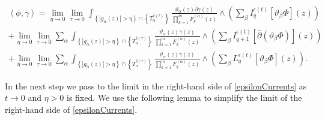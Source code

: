 \documentclass[11pt,reqno]{amsart}
\numberwithin{equation}{section}
\begin{document}
\begin{multline}\label{epsilonCurrents}
\left\langle\phi,\gamma\right\rangle
=\lim_{\eta\to 0}
\lim_{\tau\to 0}\int_{\left\{|g_{\alpha}(z)|>\eta\right\}\cap\left\{T^{\delta(\tau)}_{\alpha}\right\}}
\frac{\vartheta_{\alpha}(z)\bar\partial\gamma(z)}{\prod_{k=1}^m F^{(\alpha)}_k(z)}
\wedge\left(\sum_{\beta}I_q^{\epsilon(t)}\left[\vartheta_{\beta}\Phi\right](z)\right)\\
+\lim_{\eta\to 0}\lim_{\tau\to 0}\sum_{\alpha}
\int_{\left\{|g_{\alpha}(z)|>\eta\right\}\cap\left\{T^{\delta(\tau)}_{\alpha}\right\}}
\frac{\vartheta_{\alpha}(z)\gamma(z)}{\prod_{k=1}^m F^{(\alpha)}_k(z)}
\wedge\left(\sum_{\beta}I_{q+1}^{\epsilon(t)}
\left[\bar\partial\left(\vartheta_{\beta}\Phi\right)\right](z)\right)\\
+\lim_{\eta\to 0}\lim_{\tau\to 0}\sum_{\alpha}
\int_{\left\{|g_{\alpha}(z)|>\eta\right\}\cap\left\{T^{\delta(\tau)}_{\alpha}\right\}}
\frac{\vartheta_{\alpha}(z)\gamma(z)}{\prod_{k=1}^m F^{(\alpha)}_k(z)}
\wedge\left(\sum_{\beta}L_q^{\epsilon(t)}\left[\vartheta_{\beta}\Phi\right](z)\right).
\end{multline}

\indent
In the next step we pass to the limit in the right-hand side of \eqref{epsilonCurrents}
as $t\to 0$ and $\eta>0$ is fixed. We use the following lemma to simplify the limit
of the right-hand side of \eqref{epsilonCurrents}.
\end{document}
